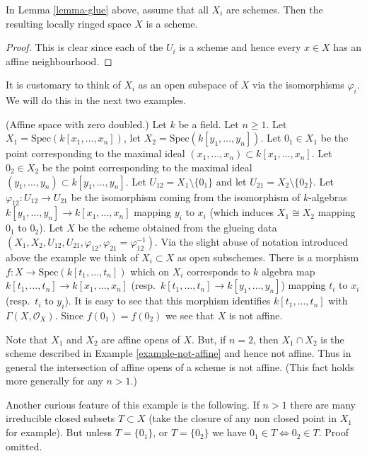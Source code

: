 \begin{lemma}
\label{lemma-glue-schemes}
In Lemma \ref{lemma-glue} above, assume that all
$X_i$ are schemes. Then the resulting locally ringed
space $X$ is a scheme.
\end{lemma}

\begin{proof}
This is clear since each of the $U_i$ is a scheme
and hence every $x \in X$ has an affine neighbourhood.
\end{proof}

\noindent
It is customary to think of $X_i$ as an open subspace of
$X$ via the isomorphisms $\varphi_i$. We will do this in
the next two examples.

\begin{example}
\label{example-affine-space-zero-doubled}
(Affine space with zero doubled.)
Let $k$ be a field. Let $n \geq 1$.
Let $X_1 = \text{Spec}(k[x_1, \ldots, x_n])$,
let $X_2 = \text{Spec}(k[y_1, \ldots, y_n])$.
Let $0_1 \in X_1$ be the point corresponding to the maximal ideal
$(x_1, \ldots, x_n) \subset k[x_1, \ldots, x_n]$.
Let $0_2 \in X_2$ be the point corresponding to the maximal ideal
$(y_1, \ldots, y_n) \subset k[y_1, \ldots, y_n]$.
Let $U_{12} = X_1 \setminus \{0_1\}$ and
let $U_{21} = X_2 \setminus \{0_2\}$. Let
$\varphi_{12} : U_{12} \to U_{21}$ be the isomorphism
coming from the isomorphism of $k$-algebras
$k[y_1, \ldots, y_n] \to k[x_1, \ldots, x_n]$
mapping $y_i$ to $x_i$ (which induces $X_1 \cong X_2$ mapping
$0_1$ to $0_2$).
Let $X$ be the scheme obtained from the glueing data
$(X_1, X_2, U_{12}, U_{21}, \varphi_{12},
\varphi_{21} = \varphi_{12}^{-1})$. Via the slight abuse
of notation introduced above the example we think of
$X_i \subset X$ as open subschemes.
There is a morphism $f : X \to \text{Spec}(k[t_1, \ldots, t_n])$
which on $X_i$ corresponds to $k$ algebra map
$k[t_1, \ldots, t_n] \to k[x_1, \ldots, x_n]$
(resp.\ $k[t_1, \ldots, t_n] \to k[y_1, \ldots, y_n]$)
mapping $t_i$ to $x_i$ (resp.\  $t_i$ to $y_i$).
It is easy to see that this morphism identifies
$k[t_1, \ldots, t_n]$ with $\Gamma(X, \mathcal{O}_X)$. Since 
$f(0_1) = f(0_2)$ we see that $X$ is not affine.

\medskip\noindent
Note that $X_1$ and $X_2$ are affine opens of $X$.
But, if $n = 2$, then $X_1 \cap X_2$ is the scheme
described in Example \ref{example-not-affine} and hence not affine.
Thus in general the intersection of affine opens of a scheme
is not affine. (This fact holds more generally for any $n > 1$.)

\medskip\noindent
Another curious feature of this example is the following.
If $n > 1$ there are many irreducible closed subsets $T \subset X$
(take the closure of any non closed point in $X_1$ for example).
But unless $T = \{0_1\}$, or $T = \{0_2\}$ we have
$0_1 \in T \Leftrightarrow 0_2 \in T$. Proof omitted.
\end{example}

